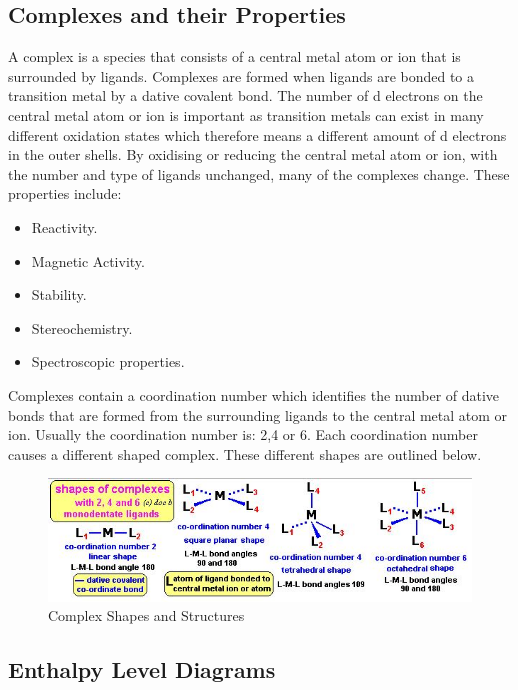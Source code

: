 	\subsection{Complexes and their Properties}

A complex is a species that consists of a central metal atom or ion that is surrounded by ligands. Complexes are formed when ligands are bonded to a transition metal by a dative covalent bond. The number of d electrons on the central metal atom or ion is important as transition metals can exist in many different oxidation states which therefore means a different amount of d electrons in the outer shells.  By oxidising or reducing the central metal atom or ion, with the number and type of ligands unchanged, many of the complexes change. These properties include:

\begin{itemize}
\item Reactivity.
\item Magnetic Activity.
\item Stability.
\item Stereochemistry.
\item Spectroscopic properties.
\end{itemize}

Complexes contain a coordination number which identifies the number of dative bonds that are formed from the surrounding ligands to the central metal atom or ion. Usually the coordination number is: 2,4 or 6. Each coordination number causes a different shaped complex. These different shapes are outlined below.

\begin{figure}[H]
    \includegraphics[width=\textwidth]{./Planning/Images/ComplexShapes.jpg}
    \caption{Complex Shapes and Structures} \label{fig:Complex Shapes}
\end{figure}




	\subsection{Enthalpy Level Diagrams}	


